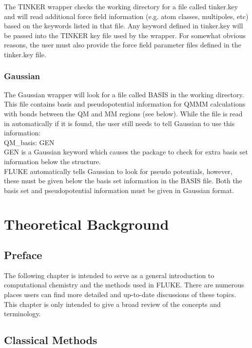 \documentclass[12pt]{report}
\begin{document}
The TINKER wrapper checks the working directory for a file called tinker.key
and will read additional force field information (e.g. atom classes,
multipoles, etc) based on the keywords listed in that file. Any keyword
defined in tinker.key will be passed into the TINKER key file used by the
wrapper. For somewhat obvious reasons, the user must also provide the force
field parameter files defined in the tinker.key file.

\subsection{Gaussian}

The Gaussian wrapper will look for a file called BASIS in the working
directory. This file contains basis and pseudopotential information for
QMMM calculations with bonds between the QM and MM regions (see below).
While the file is read in automatically if it is found, the user still needs
to tell Gaussian to use this information: \\

QM\_basis: GEN \\

GEN is a Gaussian keyword which causes the package to check for extra basis
set information below the structure. \\

FLUKE automatically tells Gaussian to look for pseudo potentials, however,
these must be given below the basis set information in the BASIS file. Both
the basis set and pseudopotential information must be given in Gaussian
format.

\chapter{Theoretical Background}
\label{chap:Theory}

\section{Preface}

The following chapter is intended to serve as a general introduction to
computational chemistry and the methods used in FLUKE. There are numerous
places users can find more detailed and up-to-date discussions of these
topics. This chapter is only intended to give a broad review of the concepts
and terminology.

\section{Classical Methods}
\end{document}
